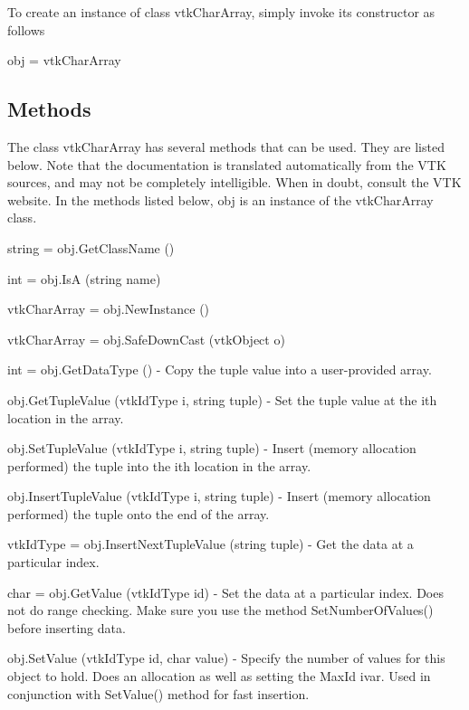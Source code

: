 To create an instance of class vtk\-Char\-Array, simply invoke its constructor as follows \begin{DoxyVerb}  obj = vtkCharArray
\end{DoxyVerb}
 \hypertarget{vtkwidgets_vtkxyplotwidget_Methods}{}\subsection{Methods}\label{vtkwidgets_vtkxyplotwidget_Methods}
The class vtk\-Char\-Array has several methods that can be used. They are listed below. Note that the documentation is translated automatically from the V\-T\-K sources, and may not be completely intelligible. When in doubt, consult the V\-T\-K website. In the methods listed below, {\ttfamily obj} is an instance of the vtk\-Char\-Array class. 
\begin{DoxyItemize}
\item {\ttfamily string = obj.\-Get\-Class\-Name ()}  
\item {\ttfamily int = obj.\-Is\-A (string name)}  
\item {\ttfamily vtk\-Char\-Array = obj.\-New\-Instance ()}  
\item {\ttfamily vtk\-Char\-Array = obj.\-Safe\-Down\-Cast (vtk\-Object o)}  
\item {\ttfamily int = obj.\-Get\-Data\-Type ()} -\/ Copy the tuple value into a user-\/provided array.  
\item {\ttfamily obj.\-Get\-Tuple\-Value (vtk\-Id\-Type i, string tuple)} -\/ Set the tuple value at the ith location in the array.  
\item {\ttfamily obj.\-Set\-Tuple\-Value (vtk\-Id\-Type i, string tuple)} -\/ Insert (memory allocation performed) the tuple into the ith location in the array.  
\item {\ttfamily obj.\-Insert\-Tuple\-Value (vtk\-Id\-Type i, string tuple)} -\/ Insert (memory allocation performed) the tuple onto the end of the array.  
\item {\ttfamily vtk\-Id\-Type = obj.\-Insert\-Next\-Tuple\-Value (string tuple)} -\/ Get the data at a particular index.  
\item {\ttfamily char = obj.\-Get\-Value (vtk\-Id\-Type id)} -\/ Set the data at a particular index. Does not do range checking. Make sure you use the method Set\-Number\-Of\-Values() before inserting data.  
\item {\ttfamily obj.\-Set\-Value (vtk\-Id\-Type id, char value)} -\/ Specify the number of values for this object to hold. Does an allocation as well as setting the Max\-Id ivar. Used in conjunction with Set\-Value() method for fast insertion.  

\end{DoxyItemize}
